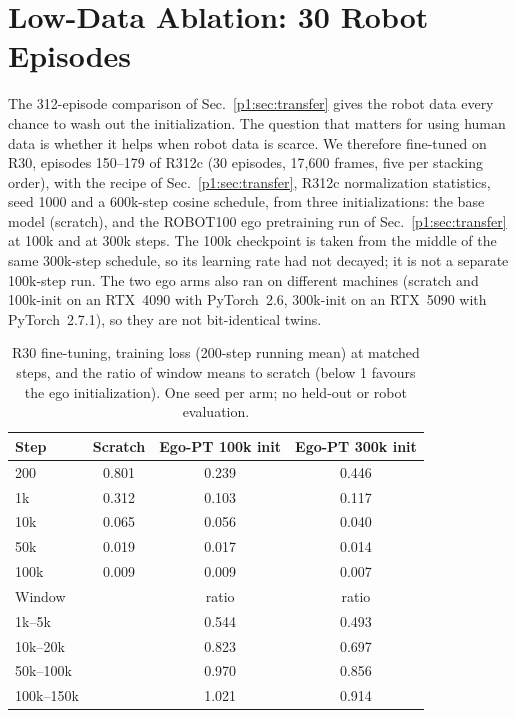 \documentclass[conference,10pt]{IEEEtran}
\begin{document}
\section{Low-Data Ablation: 30 Robot Episodes}\label{p1:sec:r30}
The 312-episode comparison of Sec.~\ref{p1:sec:transfer} gives the robot data every chance to wash out the initialization. The
question that matters for using human data is whether it helps when robot data is scarce. We therefore fine-tuned on R30,
episodes 150--179 of R312c (30 episodes, 17{,}600 frames, five per stacking order), with the recipe of
Sec.~\ref{p1:sec:transfer}, R312c normalization statistics, seed 1000 and a 600k-step cosine schedule, from three
initializations: the base model (scratch), and the ROBOT100 ego pretraining run of Sec.~\ref{p1:sec:transfer} at 100k and at
300k steps. The 100k checkpoint is taken from the middle of the same 300k-step schedule, so its learning rate had not decayed;
it is not a separate 100k-step run. The two ego arms also ran on different machines (scratch and 100k-init on an RTX~4090
with PyTorch~2.6, 300k-init on an RTX~5090 with PyTorch~2.7.1), so they are not bit-identical twins.

\begin{table}[t]
\centering\footnotesize\setlength{\tabcolsep}{4pt}
\caption{R30 fine-tuning, training loss (200-step running mean) at matched steps, and the ratio of window means to scratch
(below 1 favours the ego initialization). One seed per arm; no held-out or robot evaluation.}
\label{p1:tab:r30}
\begin{tabular}{@{}lccc@{}}
\toprule
Step & Scratch & Ego-PT 100k init & Ego-PT 300k init \\
\midrule
200 & 0.801 & 0.239 & 0.446 \\
1k & 0.312 & 0.103 & 0.117 \\
10k & 0.065 & 0.056 & 0.040 \\
50k & 0.019 & 0.017 & 0.014 \\
100k & 0.009 & 0.009 & 0.007 \\
\midrule
Window & & ratio & ratio \\
\midrule
1k--5k & & 0.544 & 0.493 \\
10k--20k & & 0.823 & 0.697 \\
50k--100k & & 0.970 & 0.856 \\
100k--150k & & 1.021 & 0.914 \\
\bottomrule
\end{tabular}
\end{table}
\end{document}
